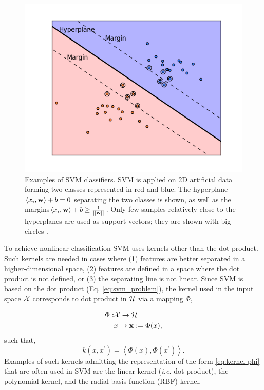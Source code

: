 \begin{figure}[!h]
\centering
\includegraphics[width=0.8\columnwidth]{Figures/svm}
\caption{Examples of SVM classifiers. 
SVM is applied on 2D artificial data forming two classes represented in red and blue. The hyperplane $\left\langle x_i, \mathbf{w} \right\rangle + b = 0$ separating the two classes is shown, as well as the margins$\left\langle x_i, \mathbf{w} \right\rangle + b \geq \frac{1}{||\mathbf{w}||}$. Only few samples relatively close to the hyperplanes are used as support vectors; they are shown with big circles \citep{scikit-learn}.}
\label{fig:svm}
\end{figure}
To achieve nonlinear classification SVM uses kernels other than the dot product.
Such kernels are needed in cases where (1) features are better separated in a higher-dimensional space, (2) features are defined in a space where the dot product is not defined, or (3) the separating line is not linear.
Since SVM is based on the dot product (Eq. \eqref{eq:svm_problem}), the kernel used in the input space $\mathcal{X}$ corresponds to dot product in $\mathcal{H}$ via a mapping $\Phi$,

\begin{equation}
\label{eq:kernel-phi}
  \begin{split}
    \Phi : & \inputSpace \rightarrow \dotSpace
		\\
    		   & x \rightarrow \mathbf{\x} := \Phi(x),
  \end{split}  
\end{equation}
such that,
\begin{equation}
\label{eq:kernel-phi2}
k(x,x^{\prime}) = \left\langle \Phi(x), \Phi(x^{\prime}) \right\rangle .
\end{equation}
Examples of such kernels admitting the representation of the form \eqref{eq:kernel-phi} that are often used in SVM are the linear kernel (\textit{i.e.} dot product), the polynomial kernel, and the radial basis function (RBF) kernel.

